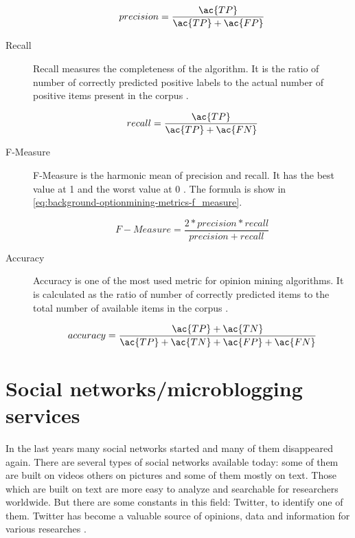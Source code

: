 \begin{description}
		\begin{equation}
			precision = \frac{\ac{TP}}{\ac{TP}+\ac{FP}}
			\label{eq:background-optionmining-metrics-precision}
		\end{equation}

	\item [Recall]
		Recall measures the completeness of the algorithm.
		It is the ratio of number of correctly predicted positive labels to the actual number of positive items present in the corpus
		\cite{Tripathy2015}.

		\begin{equation}
			recall = \frac{\ac{TP}}{\ac{TP}+\ac{FN}}
			\label{eq:background-optionmining-metrics-recall}
		\end{equation}

	\item [F-Measure]
		F-Measure is the harmonic mean of precision and recall.
		It has the best value at 1 and the worst value at 0
		\cite{Tripathy2015}.
		The formula is show in \cref{eq:background-optionmining-metrics-f_measure}.

		\begin{equation}
			F-Measure = \frac{2 * precision * recall}{precision + recall}
			\label{eq:background-optionmining-metrics-f_measure}
		\end{equation}

	\item [Accuracy]
		Accuracy is one of the most used metric for opinion mining algorithms.
		It is calculated as the ratio of number of correctly predicted items to the total number of available items in the corpus
		\cite{Tripathy2015}.

		\begin{equation}
			accuracy = \frac{\ac{TP} + \ac{TN}}{\ac{TP}+ \ac{TN} + \ac{FP} + \ac{FN}}
			\label{eq:background-optionmining-metrics-accuracy}
		\end{equation}

\end{description}

\section{Social networks/microblogging services}
\label{s:background-socialnetworks}

In the last years many social networks started and many of them disappeared again.
There are several types of social networks available today: some of them are built on videos others on pictures and some of them mostly on text.
Those which are built on text are more easy to analyze and searchable for researchers worldwide.
But there are some constants in this field: Twitter, to identify one of them.
Twitter has become a valuable source of opinions, data and information for various researches \cite{Barbosa2010}.

